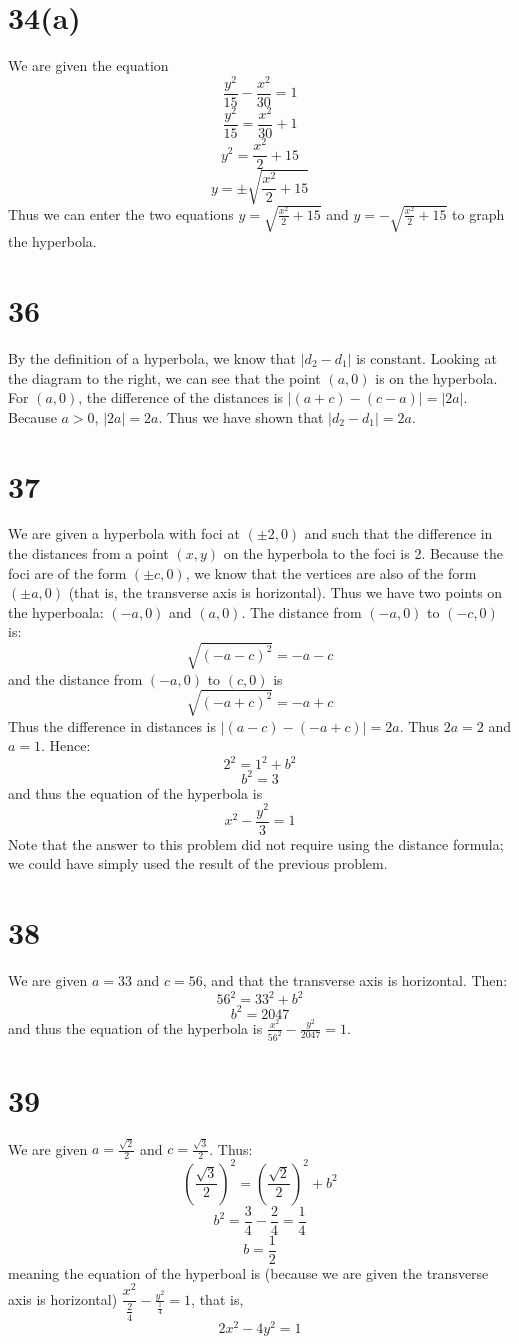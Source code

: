 \documentclass{article}
\theoremstyle{definition}
\newcommand{\?}{\stackrel{?}{=}}
\begin{document}
\section*{34(a)}
We are given the equation \[ \frac{y^2}{15}-\frac{x^2}{30}=1 \] \[ \frac{y^2}{15}=\frac{x^2}{30}+1 \]
\[ y^2=\frac{x^2}{2}+15 \] \[ y=\pm\sqrt{\frac{x^2}{2}+15} \] Thus we can enter the two equations 
$y=\sqrt{\frac{x^2}{2}+15}$ and $y=-\sqrt{\frac{x^2}{2}+15}$ to graph the hyperbola.

\section*{36}
By the definition of a hyperbola, we know that $|d_2-d_1|$ is constant. Looking at the diagram to the right, we can see that the point $(a,0)$ is on the hyperbola. 
For $(a,0)$, the difference of the distances is $|(a+c)-(c-a)|=|2a|$. Because $a>0$, $|2a|=2a$. Thus we have shown that $|d_2-d_1|=2a$.

\section*{37}
We are given a hyperbola with foci at $(\pm 2,0)$ and such that the difference in the distances from a point $(x,y)$ on the hyperbola to the foci is 2. Because the 
foci are of the form $(\pm c,0)$, we know that the vertices are also of the form $(\pm a,0)$ (that is, the transverse axis is horizontal). 
Thus we have two points on the hyperboala: $(-a,0)$ and $(a,0)$. The distance from $(-a,0)$ to $(-c,0)$ is:
\[ \sqrt{(-a-c)^2}=-a-c \] and the distance from $(-a,0)$ to $(c,0)$ is \[ \sqrt{(-a+c)^2}=-a+c \] Thus the difference in distances is
$|(a-c)-(-a+c)|=2a$. Thus $2a=2$ and $a=1$. Hence:
\[ 2^2=1^2+b^2 \] \[ b^2=3 \] and thus the equation of the hyperbola is \[ x^2-\frac{y^2}{3}=1 \] Note that the answer to this problem did not require using 
the distance formula; we could have simply used the result of the previous problem. 

\section*{38}
We are given $a=33$ and $c=56$, and that the transverse axis is horizontal. Then:
\[ 56^2=33^2+b^2 \] \[ b^2=2047 \] and thus the equation of the hyperbola is $\frac{x^2}{56^2}-\frac{y^2}{2047}=1$.

\section*{39}
We are given $a=\frac{\sqrt{2}}{2}$ and $c=\frac{\sqrt{3}}{2}$. Thus:
\[ (\frac{\sqrt{3}}{2})^2=(\frac{\sqrt{2}}{2})^2+b^2 \]
\[ b^2=\frac{3}{4}-\frac{2}{4}=\frac{1}{4} \] \[ b=\frac{1}{2} \] meaning the equation of the hyperboal is (because we are given the transverse axis is 
horizontal) $\dfrac{x^2}{\frac{2}{4}}-\frac{y^2}{\frac{1}{4}}=1$, that is, \[ 2x^2-4y^2=1 \]
\end{document}
